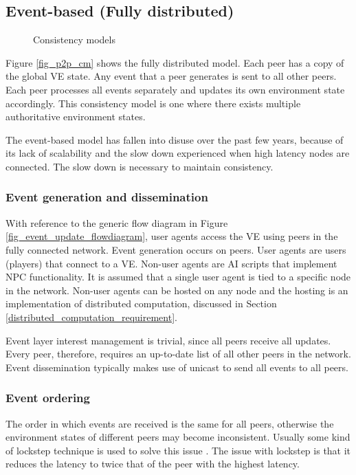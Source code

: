 \subsection{Event-based (Fully distributed)}
\label{classic_event_based}

\begin{figure}[htbp]
\centering {}
\caption{Consistency models}
\end{figure}
%
Figure \ref{fig_p2p_cm} shows the fully distributed model. Each peer has a copy of the global VE state. Any event that a peer generates is sent to all other peers. Each peer processes all events separately and updates its own environment state accordingly. This consistency model is one where there exists multiple authoritative environment states.

The event-based model has fallen into disuse over the past few years, because of its lack of scalability and the slow down experienced when high latency nodes are connected. The slow down is necessary to maintain consistency.

\subsubsection{Event generation and dissemination}

With reference to the generic flow diagram in Figure \ref{fig_event_update_flowdiagram}, user agents access the VE using peers in the fully connected network. Event generation occurs on peers. User agents are users (players) that connect to a VE. Non-user agents are AI scripts that implement NPC functionality. It is assumed that a single user agent is tied to a specific node in the network. Non-user agents can be hosted on any node and the hosting is an implementation of distributed computation, discussed in Section \ref{distributed_computation_requirement}.

Event layer interest management is trivial, since all peers receive all updates. Every peer, therefore, requires an up-to-date list of all other peers in the network. Event dissemination typically makes use of unicast to send all events to all peers.

\subsubsection{Event ordering}
The order in which events are received is the same for all peers, otherwise the environment states of different peers may become inconsistent.
Usually some kind of lockstep technique is used to solve this issue \cite{pessimistic_lock_step}. The issue with lockstep is that it reduces the latency to twice that of the peer with the highest latency.

